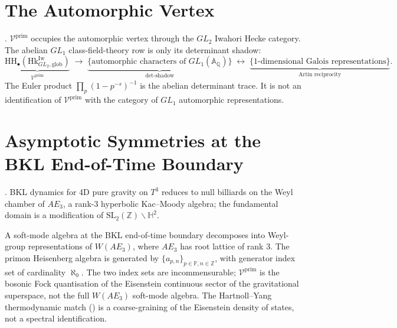 \section{The Automorphic Vertex}
\label{v4-arith:wit:automorphic-vertex}

\begin{theorem}
\label{v4-arith:thm:automorphic-vertex}
\ClaimStatusProvedHere. \(\mathcal{V}^{\mathrm{prim}}\) occupies the
automorphic vertex through the \(GL_{2}\) Iwahori Hecke category. The
abelian \(GL_{1}\) class-field-theory row is only its determinant
shadow:
\begin{equation*}
\underbrace{\mathrm{HH}_{\bullet}(\mathrm{Hk}^{\mathrm{Iw}}_{GL_{2},\mathrm{glob}})}_{\mathcal{V}^{\mathrm{prim}}}
\;\longrightarrow\;
\underbrace{\bigl\{\text{automorphic characters of }GL_{1}(\mathbb{A}_{\mathbb{Q}})\bigr\}}_{\det\text{-shadow}}
\;\longleftrightarrow\;
\underbrace{\bigl\{\text{1-dimensional Galois representations}\bigr\}}_{\text{Artin reciprocity}}.
\end{equation*}
The Euler product \(\prod_{p}(1-p^{-s})^{-1}\) is the abelian
determinant trace. It is not an identification of
\(\mathcal{V}^{\mathrm{prim}}\) with the category of \(GL_{1}\)
automorphic representations.
\end{theorem}

\section{Asymptotic Symmetries at the BKL End-of-Time Boundary}
\label{v4-arith:wit:asymptotic-symmetry}

\begin{proposition}
\label{v4-arith:prop:DHN-billiard}
\ClaimStatusProvedElsewhere. BKL dynamics for 4D pure gravity on
\(T^{3}\) reduces to null billiards on the Weyl chamber of \(AE_{3}\),
a rank-\(3\) hyperbolic Kac--Moody algebra; the fundamental domain
is a modification of \(\mathrm{SL}_{2}(\mathbb{Z})\backslash\mathbb{H}^{2}\).
\end{proposition}

\begin{observation}
\label{v4-arith:obs:asymptotic-symmetry-placement}
A soft-mode algebra at the BKL end-of-time boundary decomposes into
Weyl-group representations of \(W(AE_{3})\), where \(AE_{3}\) has
root lattice of rank \(3\). The primon Heisenberg algebra is generated
by \(\{a_{p,n}\}_{p\in\mathbb{P},n\in\mathbb{Z}}\), with generator
index set of cardinality \(\aleph_{0}\). The two index sets are
incommensurable; \(\mathcal{V}^{\mathrm{prim}}\) is the bosonic Fock
quantisation of the Eisenstein continuous sector of the gravitational
superspace, not the full \(W(AE_{3})\) soft-mode algebra. The
Hartnoll--Yang thermodynamic match
() is a coarse-graining of
the Eisenstein density of states, not a spectral identification.
\end{observation}

